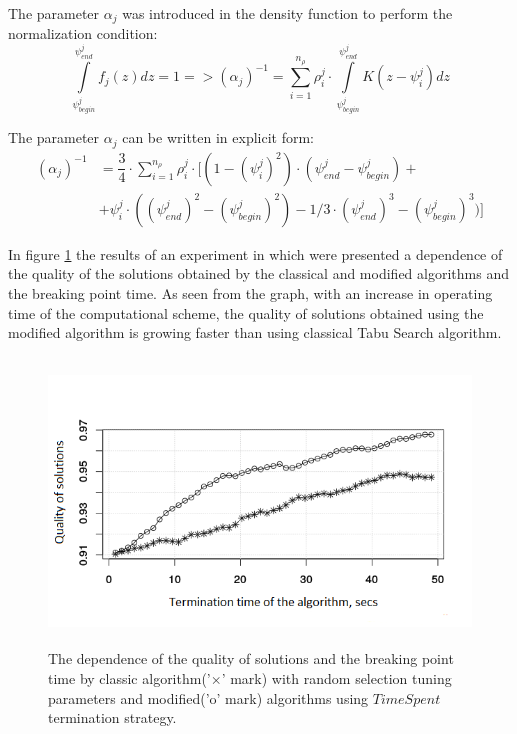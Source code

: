 \documentclass[]{TAACpaper}
\begin{document}
 The parameter $\alpha_j$ was introduced in the density function to perform the normalization condition:
 \begin{equation} \label{norm_cond}
 \int\limits_{\psi^j_{begin}}^{\psi^j_{end}} f_j(z)dz = 1  =>  (\alpha_j)^{-1} = \sum\limits_{i=1}^{n_{\rho}} \rho^j_i \cdot  \int\limits_{\psi^j_{begin}}^{\psi^j_{end}} K(z -  \psi^j_i) dz 
 \end{equation}

 The parameter $\alpha_j$ can be written in explicit form:
  \begin{equation} \label{norm_cond}
 \begin{split}
 (\alpha_j)^{-1} & = \dfrac{3}{4} \cdot \sum\limits_{i=1}^{n_{\rho}} \rho^j_i \cdot [(1 - (\psi^j_i)^2) \cdot (\psi^j_{end} - \psi^j_{begin}) + \\
 & + \psi^j_i \cdot ((\psi^j_{end})^2 - (\psi^j_{begin})^2) - 1/3 \cdot (\psi^j_{end})^3 - (\psi^j_{begin})^3)]
 \end{split}
 \end{equation}
 
 In figure \ref{aba:fig5} the results of an experiment in which  were presented a dependence of the quality of the solutions obtained by the classical and modified algorithms and  the breaking point time. As seen from the graph, with an increase in operating time of the computational scheme, the quality of solutions obtained using the modified algorithm is growing faster than using classical Tabu Search algorithm.
 
 \begin{figure}[h]
 	\hfil\includegraphics[height=3.0in]{images/tabu_mod.png}\hfil
 	\caption
 	{
 		The dependence of the quality of solutions and  the breaking point time by classic algorithm('$\times$' mark) with random selection tuning parameters and modified('o' mark) algorithms using $ TimeSpent $ termination strategy. 
 	}
 	\label{aba:fig5}
 \end{figure}
 
\end{document}
